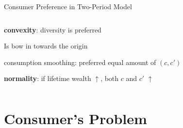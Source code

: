 \documentclass[11pt,aspectratio=169,usenames,dvipsnames]{beamer}
\let\tempone\itemize
\let\temptwo\enditemize
\renewenvironment{itemize}{\tempone\addtolength{\itemsep}{\fill}}{\temptwo}
\let\tempa\enumerate
\let\tempb\endenumerate
\renewenvironment{enumerate}{\tempa\addtolength{\itemsep}{\fill}}{\tempb}
\begin{document}
\begin{frame}{Consumer Preference in Two-Period Model}
\begin{columns}
\begin{column}{0.6\textwidth}
\begin{enumerate}
\begin{itemize}
            \end{itemize}
            \item \textbf{convexity}: diversity is preferred
            \begin{itemize}
                \item Is bow in towards the origin
                \item \alert{consumption smoothing}: preferred equal amount of $ ( c, c' ) $
            \end{itemize}
            \item \textbf{normality}: if lifetime wealth $ \uparrow  $, both $ c $ and $ c' $ $ \uparrow  $
        \end{enumerate}
    \end{column}
\end{columns}
\end{frame}

\section{Consumer's Problem}
\label{sec:Consumer_s_Problem}
\end{document}
